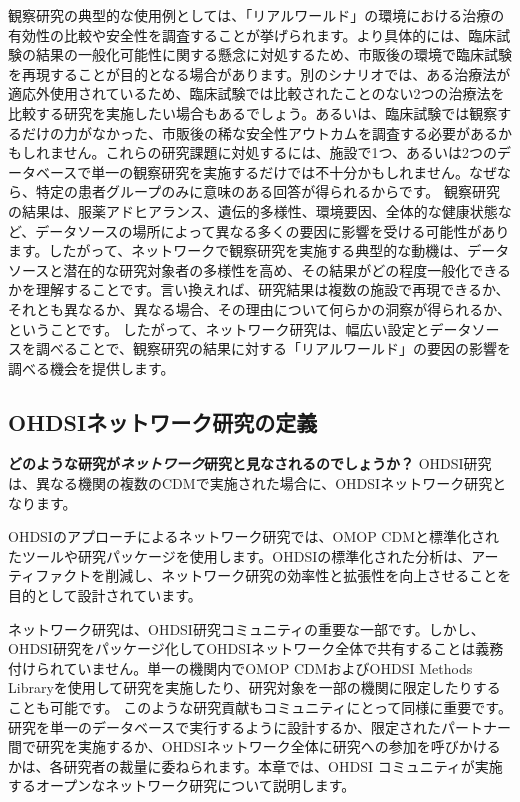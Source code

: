 \documentclass[
  11pt]{book}
\makeatletter
\newenvironment{kframe}{%
\medskip{}
\setlength{\fboxsep}{.8em}
 \def\at@end@of@kframe{}%
 \ifinner\ifhmode%
  \def\at@end@of@kframe{\end{minipage}}%
  \begin{minipage}{\columnwidth}%
 \fi\fi%
 \def\FrameCommand##1{\hskip\@totalleftmargin \hskip-\fboxsep
 \colorbox{myShadeColor}{##1}\hskip-\fboxsep
     \hskip-\linewidth \hskip-\@totalleftmargin \hskip\columnwidth}%
 \MakeFramed {\advance\hsize-\width
   \@totalleftmargin\z@ \linewidth\hsize
   \@setminipage}}%
 {\par\unskip\endMakeFramed%
 \at@end@of@kframe}
\newenvironment{rmdblock}[1]
  {
  \begin{itemize}
  \renewcommand{\labelitemi}{
    \raisebox{-.7\height}[0pt][0pt]{
      {\setkeys{Gin}{width=3em,keepaspectratio}\texttt{[image: images/\#1]}}
    }
  }
  \setlength{\fboxsep}{1em}
  \begin{kframe}
  \item
  }
  {
  \end{kframe}
  \end{itemize}
  }
\newenvironment{rmdimportant}
  {\begin{rmdblock}{important}}
  {\end{rmdblock}}
\theoremstyle{definition}
\theoremstyle{definition}
\theoremstyle{definition}
\theoremstyle{definition}
\theoremstyle{remark}
\makeatother
\begin{document}
観察研究の典型的な使用例としては、「リアルワールド」の環境における治療の有効性の比較や安全性を調査することが挙げられます。より具体的には、臨床試験の結果の一般化可能性に関する懸念に対処するため、市販後の環境で臨床試験を再現することが目的となる場合があります。別のシナリオでは、ある治療法が適応外使用されているため、臨床試験では比較されたことのない2つの治療法を比較する研究を実施したい場合もあるでしょう。あるいは、臨床試験では観察するだけの力がなかった、市販後の稀な安全性アウトカムを調査する必要があるかもしれません。これらの研究課題に対処するには、施設で1つ、あるいは2つのデータベースで単一の観察研究を実施するだけでは不十分かもしれません。なぜなら、特定の患者グループのみに意味のある回答が得られるからです。 観察研究の結果は、服薬アドヒアランス、遺伝的多様性、環境要因、全体的な健康状態など、データソースの場所によって異なる多くの要因に影響を受ける可能性があります。したがって、ネットワークで観察研究を実施する典型的な動機は、データソースと潜在的な研究対象者の多様性を高め、その結果がどの程度一般化できるかを理解することです。言い換えれば、研究結果は複数の施設で再現できるか、それとも異なるか、異なる場合、その理由について何らかの洞察が得られるか、ということです。 したがって、ネットワーク研究は、幅広い設定とデータソースを調べることで、観察研究の結果に対する「リアルワールド」の要因の影響を調べる機会を提供します。

\subsection{OHDSIネットワーク研究の定義}\label{ohdsiux30cdux30c3ux30c8ux30efux30fcux30afux7814ux7a76ux306eux5b9aux7fa9}

\begin{rmdimportant}
\textbf{どのような研究が\emph{ネットワーク}研究と見なされるのでしょうか？} OHDSI研究は、異なる機関の複数のCDMで実施された場合に、OHDSIネットワーク研究となります。
\end{rmdimportant}

OHDSIのアプローチによるネットワーク研究では、OMOP CDMと標準化されたツールや研究パッケージを使用します。OHDSIの標準化された分析は、アーティファクトを削減し、ネットワーク研究の効率性と拡張性を向上させることを目的として設計されています。

ネットワーク研究は、OHDSI研究コミュニティの重要な一部です。しかし、OHDSI研究をパッケージ化してOHDSIネットワーク全体で共有することは義務付けられていません。単一の機関内でOMOP CDMおよびOHDSI Methods Libraryを使用して研究を実施したり、研究対象を一部の機関に限定したりすることも可能です。 このような研究貢献もコミュニティにとって同様に重要です。 研究を単一のデータベースで実行するように設計するか、限定されたパートナー間で研究を実施するか、OHDSIネットワーク全体に研究への参加を呼びかけるかは、各研究者の裁量に委ねられます。本章では、OHDSI コミュニティが実施するオープンなネットワーク研究について説明します。
\end{document}
